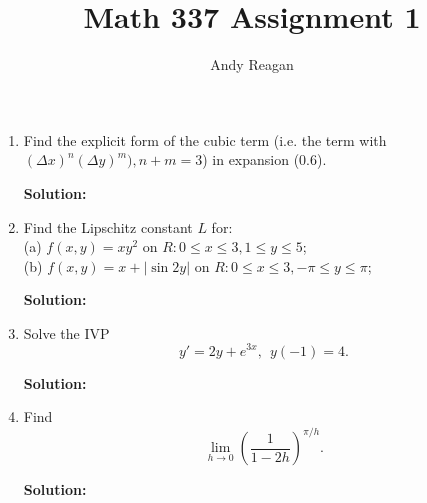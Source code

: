 \documentclass[11pt]{article}
\author{Andy Reagan}
\title{Math 337 Assignment 1}
\def\f{\frac }
\begin{document}
\maketitle
\begin{enumerate}

\item Find the explicit form of the cubic term (i.e. the term with $(\Delta x)^n (\Delta y )^m ), n+m = 3$) in expansion (0.6).

{\bf Solution:} 

\item Find the Lipschitz constant $L$ for:\\
(a) $f(x,y) = xy^2$ on $R: 0 \leq x \leq 3, 1\leq y \leq 5$;\\
(b) $f(x,y) = x + |\sin 2y |$ on $R: 0 \leq x \leq 3, -\pi\leq y \leq \pi$;

{\bf Solution:} 

\item Solve the IVP \[ y' = 2y + e^{3x} , ~~ y(-1) = 4 .\]

{\bf Solution:} 

\item Find \[ \lim _{h\to 0} \left ( \f{1}{1-2h} \right ) ^{\pi / h} .\]

{\bf Solution:} 

\end{enumerate}
\end{document}
